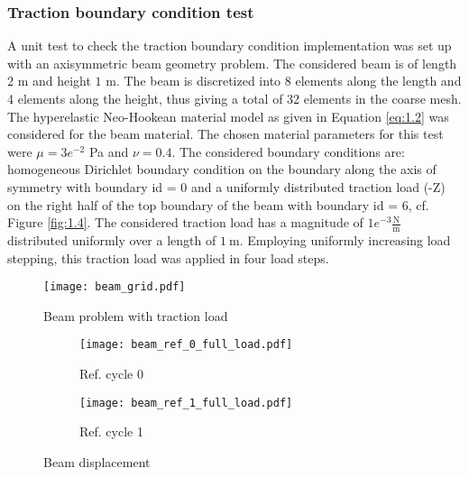 \subsubsection{Traction boundary condition test}
A unit test to check the traction boundary condition implementation was set up with an axisymmetric beam geometry problem. The considered beam is of length $2$ m and height $1$ m. The beam is discretized into 8 elements along the length and 4 elements along the height, thus giving a total of 32 elements in the coarse mesh. The hyperelastic Neo-Hookean material model as given in Equation \eqref{eq:1.2} was considered for the beam material. The chosen material parameters for this test were $\mu = 3e^{-2}$ Pa and $\nu = 0.4$. The considered boundary conditions are: homogeneous Dirichlet boundary condition on the boundary along the axis of symmetry with boundary id = 0 and a uniformly distributed traction load (-Z) on the right half of the top boundary of the beam with boundary id = 6, cf. Figure \eqref{fig:1.4}. The considered traction load has a magnitude of $1e^{-3} \frac{\text{N}}{\text{m}}$ distributed uniformly over a length of $1 \ \text{m}$. Employing uniformly increasing load stepping, this traction load was applied in four load steps. \par    

\begin{figure}[h]
\centering 
\texttt{[image: beam\_grid.pdf]}
\caption{Beam problem with traction load}
\label{fig:1.4}
\end{figure} 

\begin{figure}[h]
\centering
\begin{subfigure}[b]{0.45\textwidth}
\centering
\texttt{[image: beam\_ref\_0\_full\_load.pdf]}
\caption{Ref. cycle 0}
\label{fig:1.5.2}
\end{subfigure}
\begin{subfigure}[b]{0.45\textwidth}
\centering
\texttt{[image: beam\_ref\_1\_full\_load.pdf]}
\caption{Ref. cycle 1}
\label{fig:1.5.4}
\end{subfigure}
\caption{Beam displacement}
\label{fig:1.5}
\end{figure}

